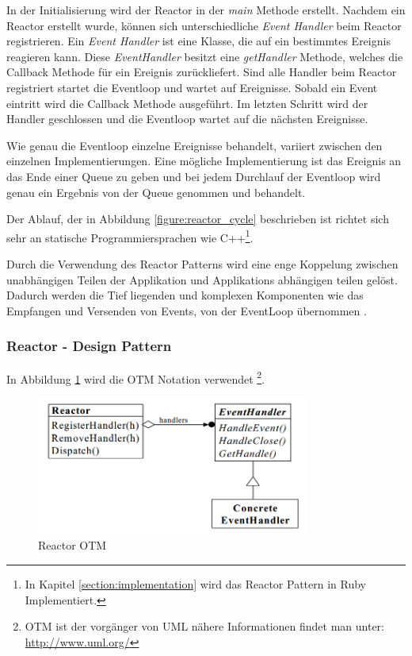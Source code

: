 In der Initialisierung wird der Reactor in der \emph{main} Methode erstellt. Nachdem ein Reactor erstellt wurde, können sich unterschiedliche \emph{Event Handler} beim Reactor registrieren. Ein \emph{Event Handler} ist eine Klasse, die auf ein bestimmtes Ereignis reagieren kann. Diese \emph{EventHandler} besitzt eine \emph{getHandler} Methode, welches die Callback Methode für ein Ereignis zurückliefert. Sind alle Handler beim Reactor registriert startet die Eventloop und wartet auf Ereignisse. Sobald ein Event eintritt wird die Callback Methode ausgeführt. Im letzten Schritt wird der Handler geschlossen und die Eventloop wartet auf die nächsten Ereignisse. 

Wie genau die Eventloop einzelne Ereignisse behandelt, variiert zwischen den einzelnen Implementierungen. Eine mögliche Implementierung ist das Ereignis an das Ende einer Queue zu geben und bei jedem Durchlauf der Eventloop wird genau ein Ergebnis von der Queue genommen und behandelt.

Der Ablauf, der in Abbildung \ref{figure:reactor_cycle} beschrieben ist richtet sich sehr an statische Programmiersprachen wie C++\footnote{In Kapitel \ref{section:implementation} wird das Reactor Pattern in Ruby Implementiert.}.

Durch die Verwendung des Reactor Patterns wird eine enge Koppelung zwischen unabhängigen Teilen der Applikation und Applikations abhängigen teilen gelöst. Dadurch werden die Tief liegenden und komplexen Komponenten wie das Empfangen und Versenden von Events, von der EventLoop übernommen \cite[p. 2]{Sch95}.

\subsubsection{Reactor - Design Pattern}

In Abbildung \ref{figure:reactor_otm} wird die OTM Notation verwendet \footnote[0]{OTM ist der vorgänger von UML nähere Informationen findet man unter: \url{http://www.uml.org/}}.

\begin{figure}[!htb]
  \centering
  \includegraphics[width=9cm]{images/reactor_otm.png}
  \caption{
    Reactor OTM \cite[p. 4]{Sch95}
  }
  \label{figure:reactor_otm}
\end{figure}

